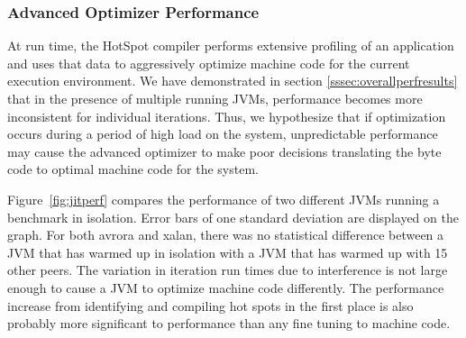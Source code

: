 \documentclass{sig-alternate}
\begin{document}
\begin{figure*}
\centering
{}
\caption{GC runtime slowdown relative to 1 JVM.}
\label{fig:gcperf}
\end{figure*}

\subsubsection{Advanced Optimizer Performance}
At run time, the HotSpot compiler performs extensive profiling of an application and uses that data to aggressively optimize machine code for the current execution environment\cite{hotspot:whitepaper}. We have demonstrated in section \ref{sssec:overallperfresults} that in the presence of multiple running JVMs, performance becomes more inconsistent for individual iterations. Thus, we hypothesize that if optimization occurs during a period of high load on the system, unpredictable performance may cause the advanced optimizer to make poor decisions translating the byte code to optimal machine code for the system.

Figure~\ref{fig:jitperf} compares the performance of two different JVMs running a benchmark in isolation. Error bars of one standard deviation are displayed on the graph. For both avrora and xalan, there was no statistical difference between a JVM that has warmed up in isolation with a JVM that has warmed up with 15 other peers. The variation in iteration run times due to interference is not large enough to cause a JVM to optimize machine code differently. The performance increase from identifying and compiling hot spots in the first place is also probably more significant to performance than any fine tuning to machine code. 

\begin{figure*}
\centering
{}
\caption{Mean total runtime of JVMs warmed up in isolation and with 16 running JVMs in parallel.}
\label{fig:jitperf}
\end{figure*}

%
%
\end{document}
